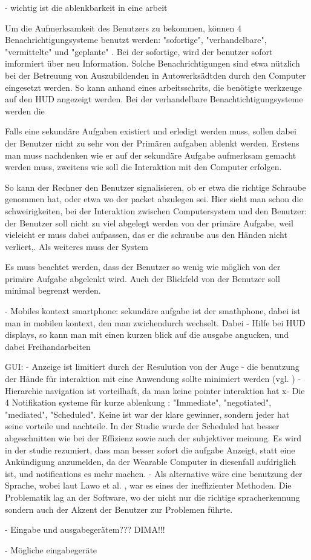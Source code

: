 - wichtig ist die ablenkbarkeit in eine arbeit

Um die Aufmerksamkeit des Benutzers zu bekommen, können 4 Benachrichtigungsysteme benutzt werden: "sofortige", "verhandelbare", "vermittelte" und "geplante" \cite{McFarlane:1999um}. Bei der sofortige, wird der benutzer sofort imformiert über neu Information. Solche Benachrichtigungen sind etwa nützlich bei der Betreuung von Auszubildenden in Autowerksädtden durch den Computer eingesetzt werden. So kann anhand eines arbeitsschrits, die benötigte werkzeuge auf den HUD angezeigt werden. Bei der verhandelbare Benachtichtigungsysteme werden die 

Falls eine sekundäre Aufgaben existiert und erledigt werden muss, sollen dabei der Benutzer nicht zu sehr von der Primären aufgaben ablenkt werden. Erstens man muss nachdenken wie er auf der sekundäre Aufgabe aufmerksam gemacht werden muss, zweitens wie soll die Interaktion mit den Computer erfolgen. 





 So kann der Rechner den Benutzer signalisieren, ob er etwa die richtige Schraube genommen hat, oder etwa wo der packet abzulegen sei. Hier sieht man schon die schweirigkeiten, bei der Interaktion zwischen Computersystem und den Benutzer: der Benutzer soll nicht zu viel abgelegt werden von der primäre Aufgabe, weil vieleicht er muss dabei aufpassen, das er die schraube aus den Händen nicht verliert,. Als weiteres muss der System

 Es muss beachtet werden, dass der Benutzer so wenig wie möglich von der primäre Aufgabe abgelenkt wird. Auch der Blickfeld von der Benutzer soll minimal begrenzt werden.


- Mobiles kontext smartphone: sekundäre aufgabe ist der smathphone, dabei ist man in mobilen kontext, den man zwichendurch wechselt. Dabei 
- Hilfe bei HUD displays, so kann man mit einen kurzen blick auf die ausgabe angucken, und dabei Freihandarbeiten



GUI: 
-  Anzeige ist limitiert durch der Resulution von der Auge \cite[Seite 60]{Starner:2001eu}
- die benutzung der Hände für interaktion mit eine Anwendung sollte minimiert werden (vgl. \cite{Rekimoto:gu})
- Hierarchie navigation ist vorteilhaft, da man keine pointer interaktion hat \cite{Blasko:ug}
x- Die 4 Notifikation systeme für kurze ablenkung \cite{McFarlane:1999um}: "Immediate", "negotiated", "mediated", "Scheduled". Keine ist war der klare gewinner, sondern jeder hat seine vorteile und nachteile. In der Studie \cite{Nilsson:cq} wurde der Scheduled hat besser abgeschnitten wie bei der Effizienz sowie auch der subjektiver meinung. Es wird in der studie rezumiert, dass man besser sofort die aufgabe Anzeigt, statt eine Ankündigung anzumelden, da der Wearable Computer in diesenfall aufdriglich ist, und notifications es mehr machen.
- Als alternative wäre eine benutzung der Sprache, wobei laut Lawo et al. \cite{Lawo:2008gg}, war es eines der ineffizienter Methoden. Die Problematik lag an der Software, wo der nicht nur die richtige spracherkennung sondern auch der Akzent der Benutzer zur Problemen führte.

- Eingabe und ausgabegerätem??? DIMA!!!

- Mögliche eingabegeräte \cite{Witt:we}
